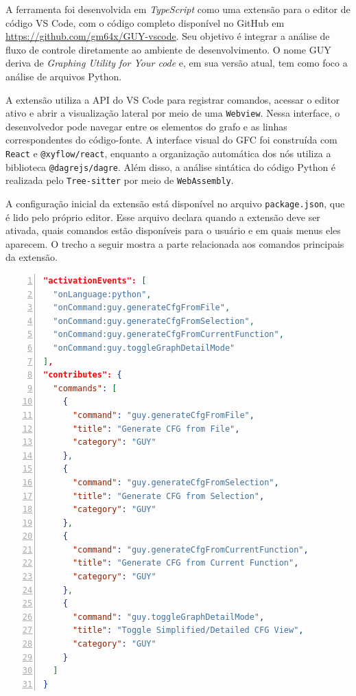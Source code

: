 
A ferramenta foi desenvolvida em \textit{TypeScript} como uma extensão para o editor de código VS Code, com o código completo disponível no GitHub em \url{https://github.com/gm64x/GUY-vscode}. Seu objetivo é integrar a análise de fluxo de controle diretamente ao ambiente de desenvolvimento. O nome GUY deriva de \textit{Graphing Utility for Your code} e, em sua versão atual, tem como foco a análise de arquivos Python.

A extensão utiliza a API do VS Code para registrar comandos, acessar o editor ativo e abrir a visualização lateral por meio de uma \texttt{Webview}. Nessa interface, o desenvolvedor pode navegar entre os elementos do grafo e as linhas correspondentes do código-fonte. A interface visual do GFC foi construída com \texttt{React} e \texttt{@xyflow/react}, enquanto a organização automática dos nós utiliza a biblioteca \texttt{@dagrejs/dagre}. Além disso, a análise sintática do código Python é realizada pelo \texttt{Tree-sitter} por meio de \texttt{WebAssembly}.

A configuração inicial da extensão está disponível no arquivo \texttt{package.json}, que é lido pelo próprio editor. Esse arquivo declara quando a extensão deve ser ativada, quais comandos estão disponíveis para o usuário e em quais menus eles aparecem. O trecho a seguir mostra a parte relacionada aos comandos principais da extensão.



\begin{lstlisting}[language=JSON, numbers=left, caption={Recorte da configuração de comandos da extensão GUY.}, label={lst:guy_package_commands}]
"activationEvents": [
  "onLanguage:python",
  "onCommand:guy.generateCfgFromFile",
  "onCommand:guy.generateCfgFromSelection",
  "onCommand:guy.generateCfgFromCurrentFunction",
  "onCommand:guy.toggleGraphDetailMode"
],
"contributes": {
  "commands": [
    {
      "command": "guy.generateCfgFromFile",
      "title": "Generate CFG from File",
      "category": "GUY"
    },
    {
      "command": "guy.generateCfgFromSelection",
      "title": "Generate CFG from Selection",
      "category": "GUY"
    },
    {
      "command": "guy.generateCfgFromCurrentFunction",
      "title": "Generate CFG from Current Function",
      "category": "GUY"
    },
    {
      "command": "guy.toggleGraphDetailMode",
      "title": "Toggle Simplified/Detailed CFG View",
      "category": "GUY"
    }
  ]
}
\end{lstlisting}

